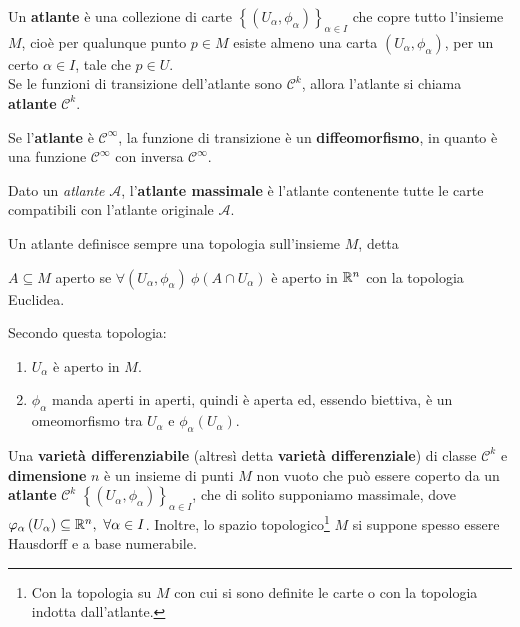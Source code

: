 \begin{define}[Atlante]
	Un \textbf{atlante} è una collezione di carte $\left\{\left(U_\alpha,\phi_\alpha\right)\right\}_{\alpha\in I}$ che copre tutto l'insieme $M$, cioè per qualunque punto $p\in M$ esiste almeno una carta $\left(U_\alpha,\phi_\alpha\right)$, per un certo $\alpha\in I$, tale che $p\in U$.\\
	Se le funzioni di transizione dell'atlante sono $\mathcal{C}^k$, allora l'atlante si chiama \textbf{atlante} $\mathcal{C}^k$.
\end{define}
Se l'\textbf{atlante} è $\mathcal{C}^\infty$, la funzione di transizione è un \textbf{diffeomorfismo}, in quanto è una funzione $\mathcal{C}^{\infty}$ con inversa $\mathcal{C}^{\infty}$.
\begin{define}
	Dato un \textit{atlante} $\mathcal{A}$, l'\textbf{atlante massimale} è l'atlante contenente tutte le carte compatibili con l'atlante originale $\mathcal{A}$.
\end{define}
\begin{define}
	Un atlante definisce sempre una topologia sull'insieme $M$, detta
	\begin{center}
		$A\subseteq M$ aperto se $\forall \left(U_\alpha, \phi_\alpha\right)\ \phi\left(A\cap U_\alpha\right)$ è aperto in $\mathbb{R}^n$ con la topologia Euclidea.
	\end{center}
\end{define}
Secondo questa topologia:
\begin{enumerate}
	\item $U_\alpha$ è aperto in $M$.
	\item $\phi_\alpha$ manda aperti in aperti, quindi è aperta ed, essendo biettiva, è un omeomorfismo tra $U_\alpha$ e $\phi_\alpha\left(U_\alpha\right)$.
\end{enumerate}
\begin{define}
	Una \textbf{varietà differenziabile} (altresì detta \textbf{varietà differenziale}) di classe $\mathcal{C}^{k}$ e \textbf{dimensione} $n$ è un insieme di punti $M$ non vuoto che può essere coperto da un \textbf{atlante} $\mathcal{C}^{k}$ $\left\{\left(U_\alpha,\phi_\alpha\right)\right\}_{\alpha\in I}$, che di solito supponiamo massimale, dove $\varphi_\alpha\left(U_\alpha\right)\subseteq \mathbb{R}^n,\ \forall \alpha\in I$. Inoltre, lo spazio topologico\footnote{Con la topologia su $M$ con cui si sono definite le carte o con la topologia indotta dall'atlante.} $M$ si suppone spesso essere Hausdorff e a base numerabile.
\end{define}
